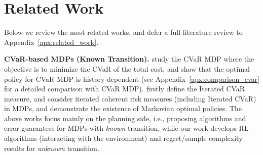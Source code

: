 \documentclass{article} %
\begin{document}
	
	
	\section{Related Work}
	
	Below we review the most related works, and defer a full literature review to Appendix~\ref{apx:related_work}.
	
	\textbf{CVaR-based MDPs (Known Transition).}
	\cite{boda2006time,ott2010markov,bauerle2011markov,chow2015risk} study the CVaR MDP where the objective is to minimize the CVaR of the total cost, and show that the optimal policy for CVaR MDP is history-dependent
	(see Appendix~\ref{apx:comparison_cvar} for a detailed comparison with CVaR MDP).
	\cite{hardy2004iterated} firstly define the Iterated CVaR measure, and
	\cite{osogami2012iterated,chu2014markov,bauerle2022markov} consider iterated coherent risk measures (including Iterated CVaR) in MDPs, and demonstrate the existence of Markovian optimal policies.
	The above works focus mainly on the planning side, i.e., proposing algorithms and error guarantees for MDPs with \emph{known} transition, while our work develops RL algorithms (interacting with the environment) and regret/sample complexity results for \emph{unknown} transition.
	
\end{document}
